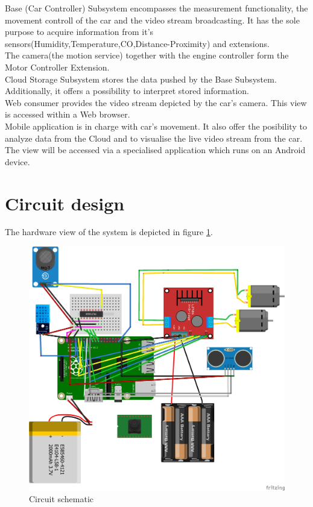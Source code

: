 \documentclass[a4paper,11pt]{article}
\begin{document}
Base (Car Controller) Subsystem encompasses the measurement functionality, the movement controll of the car and the video stream broadcasting. It has the sole purpose to acquire information from it’s sensors(Humidity,Temperature,CO,Distance-Proximity) and extensions.\\

The camera(the motion service) together with the engine controller form the Motor Controller Extension.\\

Cloud Storage Subsystem stores the data pushed by the Base Subsystem. Additionally, it offers a possibility to interpret stored information.\\

Web consumer provides the video stream depicted by the car's camera. This view is accessed within a Web browser.\\

Mobile application is in charge with car's movement. It also offer the posibility to analyze data from the Cloud and to visualise the live video stream from the car. The view will be accessed via a specialised application which runs on an Android device.

\section{Circuit design}

The hardware view of the system is depicted in figure \ref{fig:circuit-design}.

\begin{figure}[h]
\centering
\includegraphics[scale=0.7]{hardware.png}
\caption{Circuit schematic}
\label{fig:circuit-design}
\end{figure}
\end{document}
